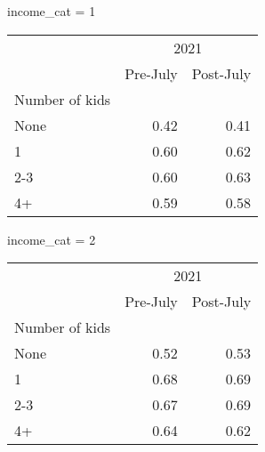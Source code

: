 income_cat = 1
\begin{tabular}{lll}
\cline{1-3}
\multicolumn{1}{c}{} &
  \multicolumn{2}{|c}{2021} \\
\multicolumn{1}{c}{} &
  \multicolumn{1}{|r}{Pre-July} &
  \multicolumn{1}{r}{Post-July} \\
\cline{1-3}
\multicolumn{1}{l}{Number of kids} &
  \multicolumn{1}{|r}{} &
  \multicolumn{1}{r}{} \\
\multicolumn{1}{l}{\hspace{1em}None} &
  \multicolumn{1}{|r}{0.42} &
  \multicolumn{1}{r}{0.41} \\
\multicolumn{1}{l}{\hspace{1em}1} &
  \multicolumn{1}{|r}{0.60} &
  \multicolumn{1}{r}{0.62} \\
\multicolumn{1}{l}{\hspace{1em}2-3} &
  \multicolumn{1}{|r}{0.60} &
  \multicolumn{1}{r}{0.63} \\
\multicolumn{1}{l}{\hspace{1em}4+} &
  \multicolumn{1}{|r}{0.59} &
  \multicolumn{1}{r}{0.58} \\
\cline{1-3}
\end{tabular}

income_cat = 2
\begin{tabular}{lll}
\cline{1-3}
\multicolumn{1}{c}{} &
  \multicolumn{2}{|c}{2021} \\
\multicolumn{1}{c}{} &
  \multicolumn{1}{|r}{Pre-July} &
  \multicolumn{1}{r}{Post-July} \\
\cline{1-3}
\multicolumn{1}{l}{Number of kids} &
  \multicolumn{1}{|r}{} &
  \multicolumn{1}{r}{} \\
\multicolumn{1}{l}{\hspace{1em}None} &
  \multicolumn{1}{|r}{0.52} &
  \multicolumn{1}{r}{0.53} \\
\multicolumn{1}{l}{\hspace{1em}1} &
  \multicolumn{1}{|r}{0.68} &
  \multicolumn{1}{r}{0.69} \\
\multicolumn{1}{l}{\hspace{1em}2-3} &
  \multicolumn{1}{|r}{0.67} &
  \multicolumn{1}{r}{0.69} \\
\multicolumn{1}{l}{\hspace{1em}4+} &
  \multicolumn{1}{|r}{0.64} &
  \multicolumn{1}{r}{0.62} \\
\cline{1-3}
\end{tabular}


